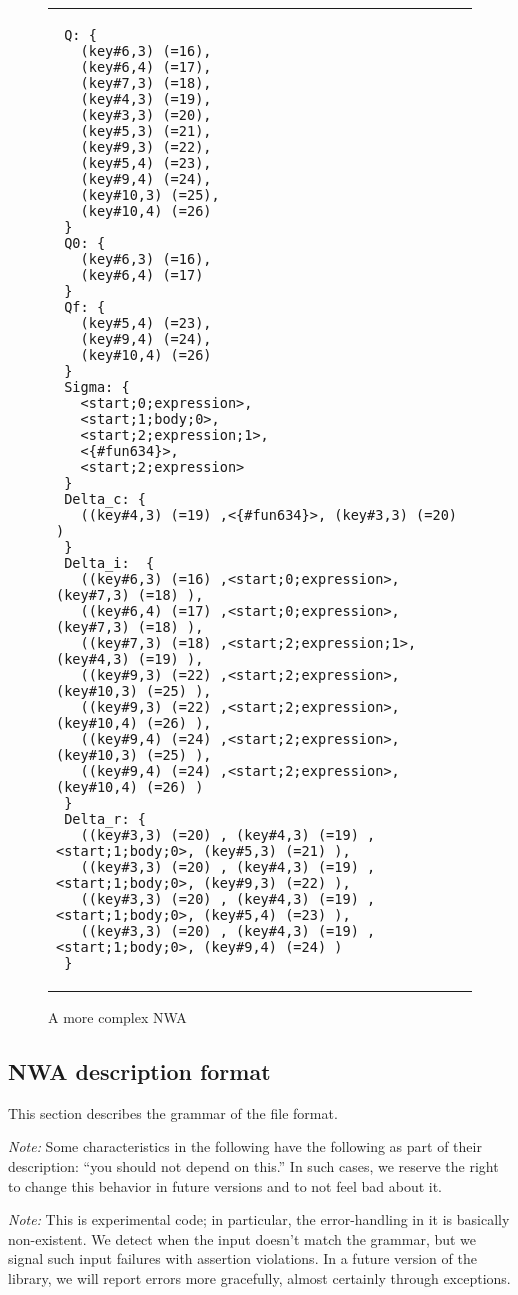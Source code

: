 \begin{figure}
\centering
\begin{tabular}{|p{5.5in}|}
\begin{verbatim}
 Q: {
   (key#6,3) (=16),
   (key#6,4) (=17),
   (key#7,3) (=18),
   (key#4,3) (=19),
   (key#3,3) (=20),
   (key#5,3) (=21),
   (key#9,3) (=22),
   (key#5,4) (=23),
   (key#9,4) (=24),
   (key#10,3) (=25),
   (key#10,4) (=26)
 }
 Q0: {
   (key#6,3) (=16),
   (key#6,4) (=17)
 }
 Qf: {
   (key#5,4) (=23),
   (key#9,4) (=24),
   (key#10,4) (=26)
 }
 Sigma: {
   <start;0;expression>,
   <start;1;body;0>,
   <start;2;expression;1>,
   <{#fun634}>,
   <start;2;expression>
 }
 Delta_c: {
   ((key#4,3) (=19) ,<{#fun634}>, (key#3,3) (=20) )
 }
 Delta_i:  {
   ((key#6,3) (=16) ,<start;0;expression>, (key#7,3) (=18) ),
   ((key#6,4) (=17) ,<start;0;expression>, (key#7,3) (=18) ),
   ((key#7,3) (=18) ,<start;2;expression;1>, (key#4,3) (=19) ),
   ((key#9,3) (=22) ,<start;2;expression>, (key#10,3) (=25) ),
   ((key#9,3) (=22) ,<start;2;expression>, (key#10,4) (=26) ),
   ((key#9,4) (=24) ,<start;2;expression>, (key#10,3) (=25) ),
   ((key#9,4) (=24) ,<start;2;expression>, (key#10,4) (=26) )
 }
 Delta_r: {
   ((key#3,3) (=20) , (key#4,3) (=19) ,<start;1;body;0>, (key#5,3) (=21) ),
   ((key#3,3) (=20) , (key#4,3) (=19) ,<start;1;body;0>, (key#9,3) (=22) ),
   ((key#3,3) (=20) , (key#4,3) (=19) ,<start;1;body;0>, (key#5,4) (=23) ),
   ((key#3,3) (=20) , (key#4,3) (=19) ,<start;1;body;0>, (key#9,4) (=24) )
 }
\end{verbatim}
\end{tabular}
\caption {A more complex NWA}
\label{Fi:nwa-mattf}
\end{figure}

\subsection{NWA description format}
\label{Se:nwa-grammar}

This section describes the grammar of the file format.

\textsl{Note:} Some characteristics in the following have the
following as part of their description: ``you should not depend on
this.'' In such cases, we reserve the right to change this behavior in
future versions and to not feel bad about it.

\textsl{Note:} This is experimental code; in particular, the
error-handling in it is basically non-existent. We detect when the
input doesn't match the grammar, but we signal such input failures
with assertion violations. In a future version of the library, we will
report errors more gracefully, almost certainly through exceptions.

